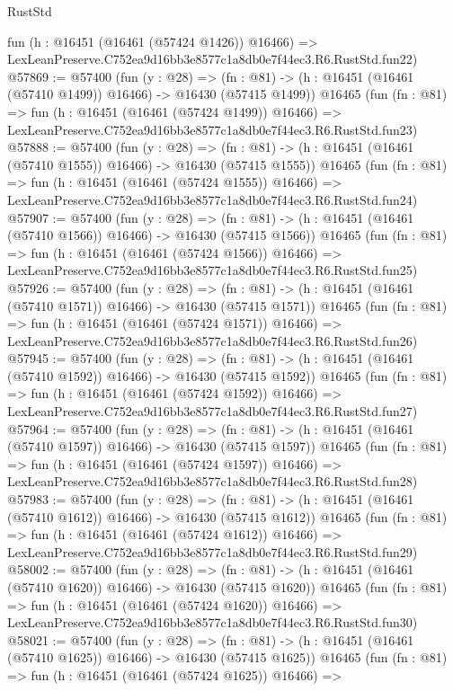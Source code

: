 \begin{lexlean}{RustStd}
\begin{coremodule}
    fun (h : @16451 (@16461 (@57424 @1426)) @16466) =>
    LexLeanPreserve.C752ea9d16bb3e8577c1a8db0e7f44ec3.R6.RustStd.fun22)
@57869 := @57400
    (fun (y : @28) =>
    (fn : @81) -> (h : @16451 (@16461 (@57410 @1499)) @16466) -> @16430 (@57415 @1499))
    @16465
    (fun (fn : @81) =>
    fun (h : @16451 (@16461 (@57424 @1499)) @16466) =>
    LexLeanPreserve.C752ea9d16bb3e8577c1a8db0e7f44ec3.R6.RustStd.fun23)
@57888 := @57400
    (fun (y : @28) =>
    (fn : @81) -> (h : @16451 (@16461 (@57410 @1555)) @16466) -> @16430 (@57415 @1555))
    @16465
    (fun (fn : @81) =>
    fun (h : @16451 (@16461 (@57424 @1555)) @16466) =>
    LexLeanPreserve.C752ea9d16bb3e8577c1a8db0e7f44ec3.R6.RustStd.fun24)
@57907 := @57400
    (fun (y : @28) =>
    (fn : @81) -> (h : @16451 (@16461 (@57410 @1566)) @16466) -> @16430 (@57415 @1566))
    @16465
    (fun (fn : @81) =>
    fun (h : @16451 (@16461 (@57424 @1566)) @16466) =>
    LexLeanPreserve.C752ea9d16bb3e8577c1a8db0e7f44ec3.R6.RustStd.fun25)
@57926 := @57400
    (fun (y : @28) =>
    (fn : @81) -> (h : @16451 (@16461 (@57410 @1571)) @16466) -> @16430 (@57415 @1571))
    @16465
    (fun (fn : @81) =>
    fun (h : @16451 (@16461 (@57424 @1571)) @16466) =>
    LexLeanPreserve.C752ea9d16bb3e8577c1a8db0e7f44ec3.R6.RustStd.fun26)
@57945 := @57400
    (fun (y : @28) =>
    (fn : @81) -> (h : @16451 (@16461 (@57410 @1592)) @16466) -> @16430 (@57415 @1592))
    @16465
    (fun (fn : @81) =>
    fun (h : @16451 (@16461 (@57424 @1592)) @16466) =>
    LexLeanPreserve.C752ea9d16bb3e8577c1a8db0e7f44ec3.R6.RustStd.fun27)
@57964 := @57400
    (fun (y : @28) =>
    (fn : @81) -> (h : @16451 (@16461 (@57410 @1597)) @16466) -> @16430 (@57415 @1597))
    @16465
    (fun (fn : @81) =>
    fun (h : @16451 (@16461 (@57424 @1597)) @16466) =>
    LexLeanPreserve.C752ea9d16bb3e8577c1a8db0e7f44ec3.R6.RustStd.fun28)
@57983 := @57400
    (fun (y : @28) =>
    (fn : @81) -> (h : @16451 (@16461 (@57410 @1612)) @16466) -> @16430 (@57415 @1612))
    @16465
    (fun (fn : @81) =>
    fun (h : @16451 (@16461 (@57424 @1612)) @16466) =>
    LexLeanPreserve.C752ea9d16bb3e8577c1a8db0e7f44ec3.R6.RustStd.fun29)
@58002 := @57400
    (fun (y : @28) =>
    (fn : @81) -> (h : @16451 (@16461 (@57410 @1620)) @16466) -> @16430 (@57415 @1620))
    @16465
    (fun (fn : @81) =>
    fun (h : @16451 (@16461 (@57424 @1620)) @16466) =>
    LexLeanPreserve.C752ea9d16bb3e8577c1a8db0e7f44ec3.R6.RustStd.fun30)
@58021 := @57400
    (fun (y : @28) =>
    (fn : @81) -> (h : @16451 (@16461 (@57410 @1625)) @16466) -> @16430 (@57415 @1625))
    @16465
    (fun (fn : @81) =>
    fun (h : @16451 (@16461 (@57424 @1625)) @16466) =>

\end{coremodule}
\end{lexlean}
